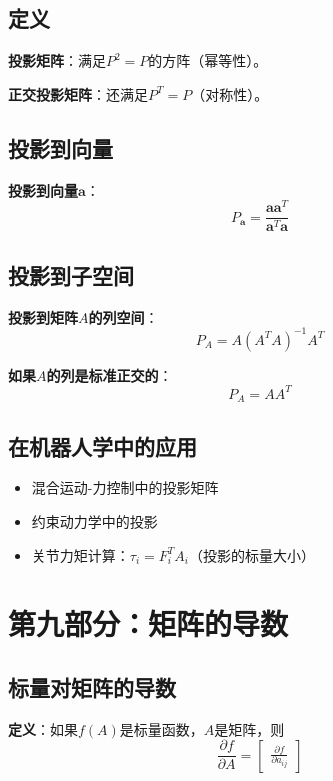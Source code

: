 \documentclass[12pt,a4paper]{article}
\begin{document}
\subsection{定义}

\textbf{投影矩阵}：满足$P^2 = P$的方阵（幂等性）。

\textbf{正交投影矩阵}：还满足$P^T = P$（对称性）。

\subsection{投影到向量}

\textbf{投影到向量$\bm{a}$}：
\begin{equation}
P_{\bm{a}} = \frac{\bm{a} \bm{a}^T}{\bm{a}^T \bm{a}}
\end{equation}

\subsection{投影到子空间}

\textbf{投影到矩阵$A$的列空间}：
\begin{equation}
P_A = A (A^T A)^{-1} A^T
\end{equation}

\textbf{如果$A$的列是标准正交的}：
\begin{equation}
P_A = A A^T
\end{equation}

\subsection{在机器人学中的应用}

\begin{itemize}
\item 混合运动-力控制中的投影矩阵
\item 约束动力学中的投影
\item 关节力矩计算：$\tau_i = F_i^T A_i$（投影的标量大小）
\end{itemize}

\section{第九部分：矩阵的导数}

\subsection{标量对矩阵的导数}

\textbf{定义}：如果$f(A)$是标量函数，$A$是矩阵，则
\begin{equation}
\frac{\partial f}{\partial A} = \begin{bmatrix} \frac{\partial f}{\partial a_{ij}} \end{bmatrix}
\end{equation}
\end{document}
